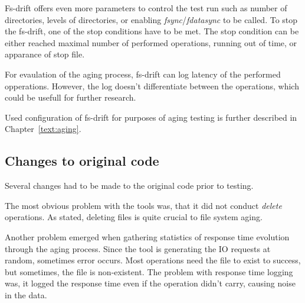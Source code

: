 \documentclass[
  color, %
  table, %
  lof,   %
  lot,   %
]{fithesis3}
\begin{document}


Fs-drift offers even more parameters to control the test run such as number of directories, levels of directories, or enabling \textit{fsync}/\textit{fdatasync} to be called. To stop the fs-drift, one of the stop conditions have to be met. The stop condition can be either reached maximal number of performed operations, running out of time, or apparance of stop file.

For evaulation of the aging process, fs-drift can log latency of the performed opperations. However, the log doesn't differentiate between the operations, which could be usefull for further research.

Used configuration of fs-drift for purposes of aging testing is further described in Chapter~\ref{text:aging}.

\subsection{Changes to original code}
\label{text:fsdrift_changes}
Several changes had to be made to the original code prior to testing.

The most obvious problem with the tools was, that it did not conduct \textit{delete} operations. As stated, deleting files is quite crucial to file system aging.

Another problem emerged when gathering statistics of response time evolution through the aging process. Since the tool is generating the IO requests at random, sometimes error occurs. Most operations need the file to exist to success, but sometimes, the file is non-existent. The problem with response time logging was, it logged the response time even if the operation didn't carry, causing noise in the data.
\end{document}
